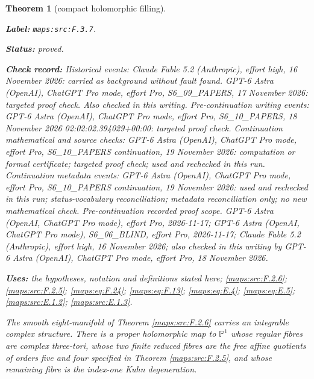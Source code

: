 \documentclass[11pt,a4paper]{article}
\newtheorem{theorem}{Theorem}[section]
\theoremstyle{definition}
\newcommand{\StatementRecord}[4]{\par\smallskip\begingroup\upshape\raggedright\noindent\textbf{Label:} \nolinkurl{#1}.\par\noindent\textbf{Status:} #2.\par\noindent\textbf{Check record:} #3.\par\noindent\textbf{Uses:} #4.\par\endgroup\smallskip}
\begin{document}
\begin{theorem}[compact holomorphic filling]\label{maps:src:F.3.7}
\StatementRecord{maps:src:F.3.7}{proved}{Historical events: Claude Fable 5.2 (Anthropic), effort high, 16 November 2026: carried as background without fault found. GPT-6 Astra (OpenAI), ChatGPT Pro mode, effort Pro, S6\_09\_PAPERS, 17 November 2026: targeted proof check. Also checked in this writing. Pre-continuation writing events: GPT-6 Astra (OpenAI), ChatGPT Pro mode, effort Pro, S6\_10\_PAPERS, 18 November 2026 02:02:02.394029+00:00: targeted proof check. Continuation mathematical and source checks: GPT-6 Astra (OpenAI), ChatGPT Pro mode, effort Pro, S6\_10\_PAPERS continuation, 19 November 2026: computation or formal certificate; targeted proof check; used and rechecked in this run. Continuation metadata events: GPT-6 Astra (OpenAI), ChatGPT Pro mode, effort Pro, S6\_10\_PAPERS continuation, 19 November 2026: used and rechecked in this run; status-vocabulary reconciliation; metadata reconciliation only; no new mathematical check. \emph{Pre-continuation recorded proof scope.} GPT-6 Astra (OpenAI, ChatGPT Pro mode), effort Pro, 2026-11-17; GPT-6 Astra (OpenAI, ChatGPT Pro mode), S6\_06\_BLIND, effort Pro, 2026-11-17; Claude Fable 5.2 (Anthropic), effort high, 16 November 2026; also checked in this writing by GPT-6 Astra (OpenAI), ChatGPT Pro mode, effort Pro, 18 November 2026}{the hypotheses, notation and definitions stated here; \cref{maps:src:F.2.6}; \cref{maps:src:F.2.5}; \cref{maps:eq:F.24}; \cref{maps:eq:F.13}; \cref{maps:eq:E.4}; \cref{maps:eq:E.5}; \cref{maps:src:E.1.2}; \cref{maps:src:E.1.3}}


The smooth eight-manifold of Theorem \ref{maps:src:F.2.6} carries an integrable
complex structure.  There is a proper holomorphic map to
$\mathbb P^1$ whose regular fibres are complex three-tori,
whose two finite reduced fibres are the free affine quotients
of orders five and four specified in Theorem \ref{maps:src:F.2.5}, and whose
remaining fibre is the index-one Kuhn degeneration.

\end{theorem}
\end{document}
